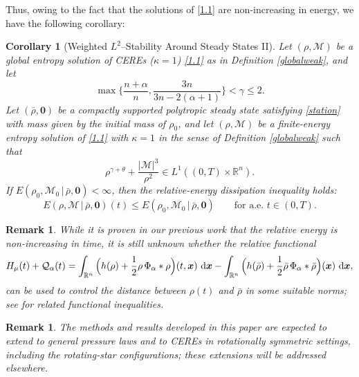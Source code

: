 \documentclass[reqno,11pt]{amsart}
\numberwithin{equation}{section}
\newtheorem{corollary}[theorem]{Corollary}
\newtheorem{remark}[theorem]{Remark}
\theoremstyle{definition}
\def\dd{{\, \rm d}}
\begin{document}
Thus, owing to the fact that the solutions of \eqref{1.1} are non-increasing in energy, we have the following corollary:
\begin{corollary}[Weighted $L^2$--Stability Around Steady States II]
Let $(\rho,\mathcal M)$ be a global entropy solution of CEREs {\rm(}$\kappa=1${\rm)} \eqref{1.1} as in
{\rm Definition \ref{globalweak}}, and let
\[
\max \Big\{\frac{n + \alpha}{n},\frac{3n}{3n - 2(\alpha + 1)} \Big\}<\gamma\le2.
\]
Let $(\bar\rho,\boldsymbol{0})$ be a compactly supported polytropic steady state satisfying
\eqref{station} with mass given by the initial mass of $\rho_0$, and let $(\rho,\mathcal M)$ be a finite-energy entropy solution of
\eqref{1.1} with $\kappa=1$ in the sense of {\rm Definition \ref{globalweak}} such that
\begin{equation*}
 \rho^{\gamma+\theta}+\frac{|\mathcal M|^3}{\rho^2}
 \in L^1((0,T)\times\mathbb R^n).
\end{equation*}
If $E(\rho_0,\mathcal{M}_0\, | \, \bar{\rho}, \boldsymbol{0})<\infty$, then the relative-energy 
dissipation inequality holds{\rm :}
\begin{equation*}
E(\rho,\mathcal{M}\, | \, \bar{\rho}, \boldsymbol{0})(t) \le E(\rho_0,\mathcal{M}_0\, | \, \bar{\rho}, \boldsymbol{0})
 \qquad\text{for a.e. }t\in(0,T).
\end{equation*}
\end{corollary}

\begin{remark}
    While it is proven in our previous work {\rm \cite[Section 5]{Carrillo2025}} that the relative energy is non-increasing in time, it is still unknown whether the relative functional
    \[
    H_\mu(t) +\mathcal Q_\alpha(t) = \int_{\mathbb R^n} \Big ( h(\rho)+\frac{1}{2}\rho\,\Phi_\alpha * \rho\Big)(t,\boldsymbol{x})\,\dd\boldsymbol{x} - \int_{\mathbb R^n} \Big ( h(\bar\rho)+\frac{1}{2}\bar\rho\,\Phi_\alpha * \bar\rho\Big)(\boldsymbol{x})\,\dd\boldsymbol{x},
    \]
    can be used to control the distance between $\rho(t)$ and $\bar\rho$ in some suitable norms{\rm ;} 
    see {\rm\cite{YY20}} for related functional inequalities.
\end{remark}

\begin{remark}
The methods and results developed in this paper are expected to extend to general pressure laws and to CEREs in rotationally symmetric settings, including the rotating-star configurations{\rm ;} these extensions will be addressed elsewhere.
\end{remark}
\end{document}
